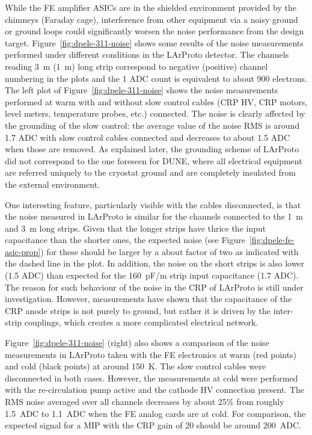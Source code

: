 While the FE amplifier ASICs are in the shielded environment provided by the chimneys (Faraday cage), interference from other equipment via a noisy ground or ground loops could significantly worsen the noise performance from the design target. Figure~\ref{fig:dpele-311-noise} shows some results of the noise measurements performed under different conditions in the LArProto detector. The channels reading \SI{3}{\meter} (\SI{1}{\metre}) long strip correspond to negative (positive) channel numbering in the plots and the 1 ADC count is equivalent to about 900 electrons. The left plot of Figure~\ref{fig:dpele-311-noise} shows the noise measurements performed at warm with and without slow control cables (CRP HV, CRP motors, level meters, temperature probes, etc.) connected. The noise is clearly affected by the grounding of the slow control: the average value of the noise RMS is around \num{1.7} ADC with slow control cables connected and decreases to about \num{1.5} ADC when those are removed. As explained later, the grounding scheme of LArProto did not correspond to the one foreseen for DUNE, where all electrical equipment are referred uniquely to the cryostat ground and are completely insulated from the external environment. 

One interesting feature, particularly visible with the cables disconnected, is that the noise measured in LArProto is similar for the channels connected to the \SI{1}{\meter} and \SI{3}{\meter} long strips. Given that the longer strips have thrice the input capacitance than the shorter ones, the expected noise (see Figure~\ref{fig:dpele-fe-asic-prop}) for these should be larger by a about factor of two as indicated with the dashed line in the plot. In addition, the noise on the short strips is also lower (\num{1.5} ADC) than expected for the \SI{160}{pF/m} strip input capacitance (1.7 ADC). The reason for such behaviour of the noise in the CRP of LArProto is still under investigation. However, measurements have shown that the capacitance of the CRP anode strips is not purely to ground, but rather it is driven by the inter-strip couplings, which creates a more complicated electrical network. 

Figure~\ref{fig:dpele-311-noise} (right) also shows a comparison of the noise measurements in LArProto taken with the FE electronics at warm (red points) and cold (black points) at around \SI{150}{\kelvin}. The slow control cables were disconnected in both cases. However, the measurements at cold were performed with the re-circulation pump active and the cathode HV connection present. The RMS noise averaged over all channels decreases by about 25\% from roughly \SI{1.5}{ADC} to \SI{1.1}{ADC} when the FE analog cards are at cold. For comparison, the expected signal for a MIP with the CRP gain of 20 should be around \SI{200}{ADC}. 

